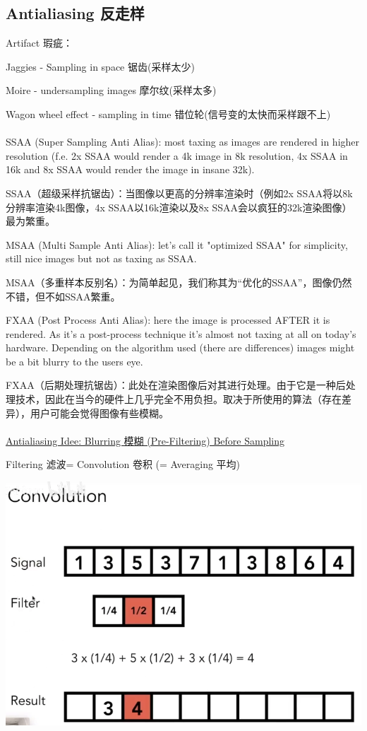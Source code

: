 \documentclass[fleqn]{article}
\begin{document}
\subsection{Antialiasing 反走样}

\noindent Artifact 瑕疵：

Jaggies - Sampling in space 锯齿(采样太少)

Moire - undersampling images 摩尔纹(采样太多)

Wagon wheel effect - sampling in time 错位轮(信号变的太快而采样跟不上)
\\
\\
\indent SSAA (Super Sampling Anti Alias): most taxing as images are rendered in higher resolution (f.e. 2x SSAA would render a 4k image in 8k resolution, 4x SSAA in 16k and 8x SSAA would render the image in insane 32k).

SSAA（超级采样抗锯齿）：当图像以更高的分辨率渲染时（例如2x SSAA将以8k分辨率渲染4k图像，4x SSAA以16k渲染以及8x SSAA会以疯狂的32k渲染图像）最为繁重。


MSAA (Multi Sample Anti Alias): let's call it "optimized SSAA" for simplicity, still nice images but not as taxing as SSAA.

MSAA（多重样本反别名）：为简单起见，我们称其为“优化的SSAA”，图像仍然不错，但不如SSAA繁重。


FXAA (Post Process Anti Alias): here the image is processed AFTER it is rendered. As it's a post-process technique it's almost not taxing at all on today's hardware. Depending on the algorithm used (there are differences) images might be a bit blurry to the users eye.

FXAA（后期处理抗锯齿）：此处在渲染图像后对其进行处理。由于它是一种后处理技术，因此在当今的硬件上几乎完全不用负担。取决于所使用的算法（存在差异），用户可能会觉得图像有些模糊。
\\
\\
\underline{Antialiasing Idee: Blurring 模糊 (Pre-Filtering) Before Sampling}

\indent\indent Filtering 滤波= Convolution 卷积 (= Averaging 平均)

\begin{center}
    \includegraphics[scale=0.4]{20.png}
\end{center}
\end{document}
